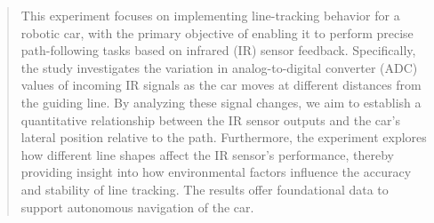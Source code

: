 \begin{abstract}
\noindent This experiment focuses on implementing line-tracking behavior for a robotic car, with the primary objective of enabling it to perform precise path-following tasks based on infrared (IR) sensor feedback.
Specifically, the study investigates the variation in analog-to-digital converter (ADC) values of incoming IR signals as the car moves at different distances from the guiding line.
By analyzing these signal changes, we aim to establish a quantitative relationship between the IR sensor outputs and the car’s lateral position relative to the path.
Furthermore, the experiment explores how different line shapes affect the IR sensor’s performance, thereby providing insight into how environmental factors influence the accuracy and stability of line tracking.
The results offer foundational data to support autonomous navigation of the car.

\end{abstract}